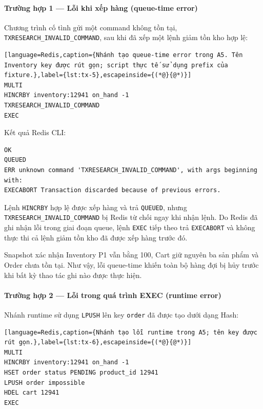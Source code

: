 \paragraph*{Trường hợp 1 — Lỗi khi xếp hàng (queue-time error)}

Chương trình cố tình gửi một command không tồn tại, \texttt{TXRESEARCH\_\allowbreak{}INVALID\_\allowbreak{}COMMAND}, sau khi đã xếp một lệnh giảm tồn kho hợp lệ:

\reportblockspace{72pt}
\begin{lstlisting}[language=Redis,caption={Nhánh tạo queue-time error trong A5. Tên Inventory key được rút gọn; script thực tế sử dụng prefix của fixture.},label={lst:tx-5},escapeinside={(*@}{@*)}]
MULTI
HINCRBY inventory:12941 on_hand -1
TXRESEARCH_INVALID_COMMAND
EXEC
\end{lstlisting}

Kết quả Redis CLI:

\reportblockspace{72pt}
\begingroup
{}\label{result:tx-4}
\nopagebreak[4]
\begin{Verbatim}
OK
QUEUED
ERR unknown command 'TXRESEARCH_INVALID_COMMAND', with args beginning with:
EXECABORT Transaction discarded because of previous errors.
\end{Verbatim}
\endgroup\par\smallskip
Lệnh \texttt{HINCRBY} hợp lệ được xếp hàng và trả \texttt{QUEUED}, nhưng \texttt{TXRESEARCH\_\allowbreak{}INVALID\_\allowbreak{}COMMAND} bị Redis từ chối ngay khi nhận lệnh. Do Redis đã ghi nhận lỗi trong giai đoạn queue, lệnh \texttt{EXEC} tiếp theo trả \texttt{EXECABORT} và không thực thi cả lệnh giảm tồn kho đã được xếp hàng trước đó.

Snapshot xác nhận Inventory P1 vẫn bằng 100, Cart giữ nguyên ba sản phẩm và Order chưa tồn tại. Như vậy, lỗi queue-time khiến toàn bộ hàng đợi bị hủy trước khi bất kỳ thao tác ghi nào được thực hiện.

\paragraph*{Trường hợp 2 — Lỗi trong quá trình EXEC (runtime error)}

Nhánh runtime sử dụng \texttt{LPUSH} lên key \texttt{order} đã được tạo dưới dạng Hash:

\reportblockspace{72pt}
\begin{lstlisting}[language=Redis,caption={Nhánh tạo lỗi runtime trong A5; tên key được rút gọn.},label={lst:tx-6},escapeinside={(*@}{@*)}]
MULTI
HINCRBY inventory:12941 on_hand -1
HSET order status PENDING product_id 12941
LPUSH order impossible
HDEL cart 12941
EXEC
\end{lstlisting}

